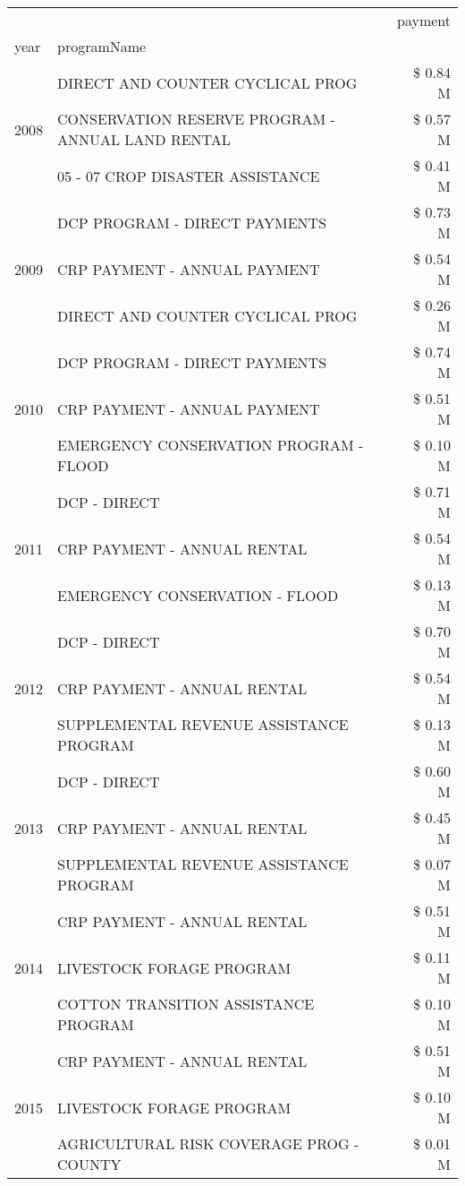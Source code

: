 \begin{tabular}{llr}
\toprule
 &  & payment \\
year & programName &  \\
\midrule
\multirow[t]{3}{*}{2008} & DIRECT AND COUNTER CYCLICAL PROG & \$ 0.84 M \\
 & CONSERVATION RESERVE PROGRAM - ANNUAL LAND RENTAL & \$ 0.57 M \\
 & 05 - 07 CROP DISASTER ASSISTANCE & \$ 0.41 M \\
\cline{1-3}
\multirow[t]{3}{*}{2009} & DCP PROGRAM - DIRECT PAYMENTS & \$ 0.73 M \\
 & CRP PAYMENT - ANNUAL PAYMENT & \$ 0.54 M \\
 & DIRECT AND COUNTER CYCLICAL PROG & \$ 0.26 M \\
\cline{1-3}
\multirow[t]{3}{*}{2010} & DCP PROGRAM - DIRECT PAYMENTS & \$ 0.74 M \\
 & CRP PAYMENT - ANNUAL PAYMENT & \$ 0.51 M \\
 & EMERGENCY CONSERVATION PROGRAM - FLOOD & \$ 0.10 M \\
\cline{1-3}
\multirow[t]{3}{*}{2011} & DCP - DIRECT & \$ 0.71 M \\
 & CRP PAYMENT - ANNUAL RENTAL & \$ 0.54 M \\
 & EMERGENCY CONSERVATION - FLOOD & \$ 0.13 M \\
\cline{1-3}
\multirow[t]{3}{*}{2012} & DCP - DIRECT & \$ 0.70 M \\
 & CRP PAYMENT - ANNUAL RENTAL & \$ 0.54 M \\
 & SUPPLEMENTAL REVENUE ASSISTANCE PROGRAM & \$ 0.13 M \\
\cline{1-3}
\multirow[t]{3}{*}{2013} & DCP - DIRECT & \$ 0.60 M \\
 & CRP PAYMENT - ANNUAL RENTAL & \$ 0.45 M \\
 & SUPPLEMENTAL REVENUE ASSISTANCE PROGRAM & \$ 0.07 M \\
\cline{1-3}
\multirow[t]{3}{*}{2014} & CRP PAYMENT - ANNUAL RENTAL & \$ 0.51 M \\
 & LIVESTOCK FORAGE PROGRAM & \$ 0.11 M \\
 & COTTON TRANSITION ASSISTANCE PROGRAM & \$ 0.10 M \\
\cline{1-3}
\multirow[t]{3}{*}{2015} & CRP PAYMENT - ANNUAL RENTAL & \$ 0.51 M \\
 & LIVESTOCK FORAGE PROGRAM & \$ 0.10 M \\
 & AGRICULTURAL RISK COVERAGE PROG - COUNTY & \$ 0.01 M \\
\cline{1-3}

\end{tabular}

